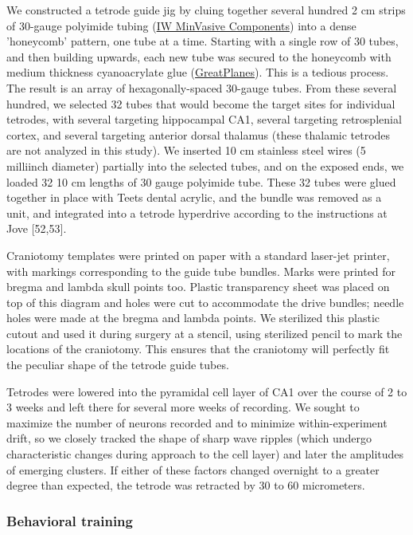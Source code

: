 \documentclass[]{article}
\begin{document}
We constructed a tetrode guide jig by cluing together several hundred 2
cm strips of 30-gauge polyimide tubing
(\href{Ihttp://www.minvasivecomponents.com}{IW MinVasive Components})
into a dense 'honeycomb' pattern, one tube at a time. Starting with a
single row of 30 tubes, and then building upwards, each new tube was
secured to the honeycomb with medium thickness cyanoacrylate glue
(\href{http://www.greatplanes.com/accys/gpmr6001.html}{GreatPlanes}).
This is a tedious process. The result is an array of hexagonally-spaced
30-gauge tubes. From these several hundred, we selected 32 tubes that
would become the target sites for individual tetrodes, with several
targeting hippocampal CA1, several targeting retrosplenial cortex, and
several targeting anterior dorsal thalamus (these thalamic tetrodes are
not analyzed in this study). We inserted 10 cm stainless steel wires (5
milliinch diameter) partially into the selected tubes, and on the
exposed ends, we loaded 32 10 cm lengths of 30 gauge polyimide tube.
These 32 tubes were glued together in place with Teets dental acrylic,
and the bundle was removed as a unit, and integrated into a tetrode
hyperdrive according to the instructions at Jove {[}52,53{]}.

Craniotomy templates were printed on paper with a standard laser-jet
printer, with markings corresponding to the guide tube bundles. Marks
were printed for bregma and lambda skull points too. Plastic
transparency sheet was placed on top of this diagram and holes were cut
to accommodate the drive bundles; needle holes were made at the bregma
and lambda points. We sterilized this plastic cutout and used it during
surgery at a stencil, using sterilized pencil to mark the locations of
the craniotomy. This ensures that the craniotomy will perfectly fit the
peculiar shape of the tetrode guide tubes.

Tetrodes were lowered into the pyramidal cell layer of CA1 over the
course of 2 to 3 weeks and left there for several more weeks of
recording. We sought to maximize the number of neurons recorded and to
minimize within-experiment drift, so we closely tracked the shape of
sharp wave ripples (which undergo characteristic changes during approach
to the cell layer) and later the amplitudes of emerging clusters. If
either of these factors changed overnight to a greater degree than
expected, the tetrode was retracted by 30 to 60 micrometers.

\subsubsection{Behavioral training}
\end{document}
